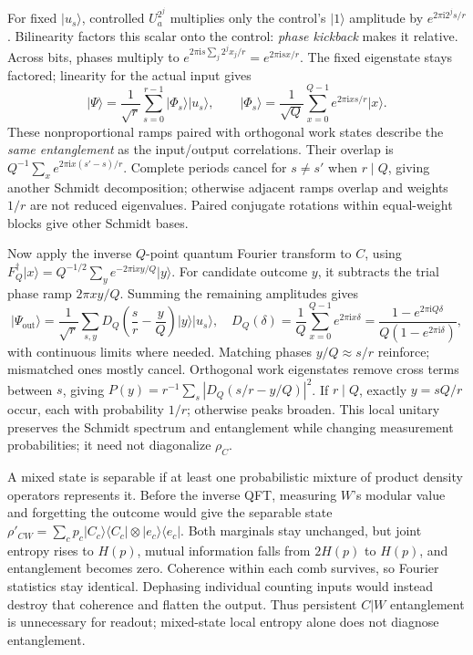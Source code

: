 \documentclass[11pt,a4paper]{article}
\newcommand{\ket}[1]{\lvert #1\rangle}
\newcommand{\bra}[1]{\langle #1\rvert}
\newcommand{\ii}{\mathrm{i}}
\begin{document}
For fixed \(\ket{u_s}\), controlled \(U_a^{2^j}\) multiplies only the control's \(\ket1\) amplitude by \(e^{2\pi\ii2^js/r}\). Bilinearity factors this scalar onto the control: \emph{phase kickback} makes it relative. Across bits, phases multiply to \(e^{2\pi\ii s\sum_j2^jx_j/r}=e^{2\pi\ii sx/r}\). The fixed eigenstate stays factored; linearity for the actual input gives
\[
\ket\Psi=\frac1{\sqrt r}\sum_{s=0}^{r-1}\ket{\Phi_s}\ket{u_s},
\qquad
\ket{\Phi_s}=\frac1{\sqrt Q}\sum_{x=0}^{Q-1}e^{2\pi\ii xs/r}\ket x.
\]
These nonproportional ramps paired with orthogonal work states describe the \emph{same entanglement} as the input/output correlations. Their overlap is \(Q^{-1}\sum_xe^{2\pi\ii x(s'-s)/r}\). Complete periods cancel for \(s\ne s'\) when \(r\mid Q\), giving another Schmidt decomposition; otherwise adjacent ramps overlap and weights \(1/r\) are not reduced eigenvalues. Paired conjugate rotations within equal-weight blocks give other Schmidt bases.

Now apply the inverse \(Q\)-point quantum Fourier transform to \(C\), using \(F_Q^\dagger\ket x=Q^{-1/2}\sum_y e^{-2\pi\ii xy/Q}\ket y\). For candidate outcome \(y\), it subtracts the trial phase ramp \(2\pi xy/Q\). Summing the remaining amplitudes gives
\[
\ket{\Psi_{\mathrm{out}}}=\frac1{\sqrt r}\sum_{s,y}D_Q\!\left(\frac sr-\frac yQ\right)\ket y\ket{u_s},
\quad
D_Q(\delta)=\frac1Q\sum_{x=0}^{Q-1}e^{2\pi\ii x\delta}
=\frac{1-e^{2\pi\ii Q\delta}}{Q(1-e^{2\pi\ii\delta})},
\]
with continuous limits where needed. Matching phases \(y/Q\approx s/r\) reinforce; mismatched ones mostly cancel. Orthogonal work eigenstates remove cross terms between \(s\), giving \(P(y)=r^{-1}\sum_s|D_Q(s/r-y/Q)|^2\). If \(r\mid Q\), exactly \(y=sQ/r\) occur, each with probability \(1/r\); otherwise peaks broaden. This local unitary preserves the Schmidt spectrum and entanglement while changing measurement probabilities; it need not diagonalize \(\rho_C\).

A mixed state is separable if at least one probabilistic mixture of product density operators represents it. Before the inverse QFT, measuring \(W\)'s modular value and forgetting the outcome would give the separable state \(\rho'_{CW}=\sum_cp_c\ket{C_c}\bra{C_c}\otimes\ket{e_c}\bra{e_c}\). Both marginals stay unchanged, but joint entropy rises to \(H(p)\), mutual information falls from \(2H(p)\) to \(H(p)\), and entanglement becomes zero. Coherence within each comb survives, so Fourier statistics stay identical. Dephasing individual counting inputs would instead destroy that coherence and flatten the output. Thus persistent \(C|W\) entanglement is unnecessary for readout; mixed-state local entropy alone does not diagnose entanglement.
\end{document}
